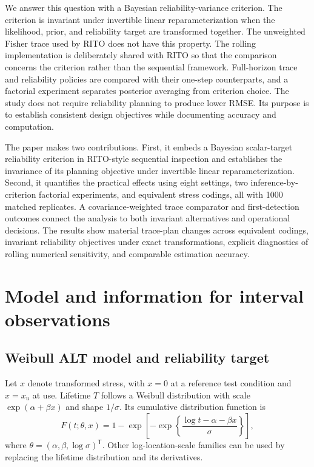 \documentclass[a4paper,fleqn]{cas-sc}
\begin{document}
We answer this question with a Bayesian reliability-variance criterion. The criterion is invariant under invertible linear reparameterization when the likelihood, prior, and reliability target are transformed together. The unweighted Fisher trace used by RITO does not have this property. The rolling implementation is deliberately shared with RITO so that the comparison concerns the criterion rather than the sequential framework. Full-horizon trace and reliability policies are compared with their one-step counterparts, and a factorial experiment separates posterior averaging from criterion choice. The study does not require reliability planning to produce lower RMSE. Its purpose is to establish consistent design objectives while documenting accuracy and computation.

The paper makes two contributions. First, it embeds a Bayesian scalar-target reliability criterion in RITO-style sequential inspection and establishes the invariance of its planning objective under invertible linear reparameterization. Second, it quantifies the practical effects using eight settings, two inference-by-criterion factorial experiments, and equivalent stress codings, all with 1000 matched replicates. A covariance-weighted trace comparator and first-detection outcomes connect the analysis to both invariant alternatives and operational decisions. The results show material trace-plan changes across equivalent codings, invariant reliability objectives under exact transformations, explicit diagnostics of rolling numerical sensitivity, and comparable estimation accuracy.

\section{Model and information for interval observations}

\subsection{Weibull ALT model and reliability target}

Let $x$ denote transformed stress, with $x=0$ at a reference test condition and $x=x_u$ at use. Lifetime $T$ follows a Weibull distribution with scale $\exp(\alpha+\beta x)$ and shape $1/\sigma$. Its cumulative distribution function is
\begin{equation}
F(t;\theta,x)=1-\exp\left[-\exp\left\{\frac{\log t-\alpha-\beta x}{\sigma}\right\}\right],
\label{eq:cdf}
\end{equation}
where $\theta=(\alpha,\beta,\log\sigma)^{\mathsf T}$. Other log-location-scale families can be used by replacing the lifetime distribution and its derivatives.
\end{document}
